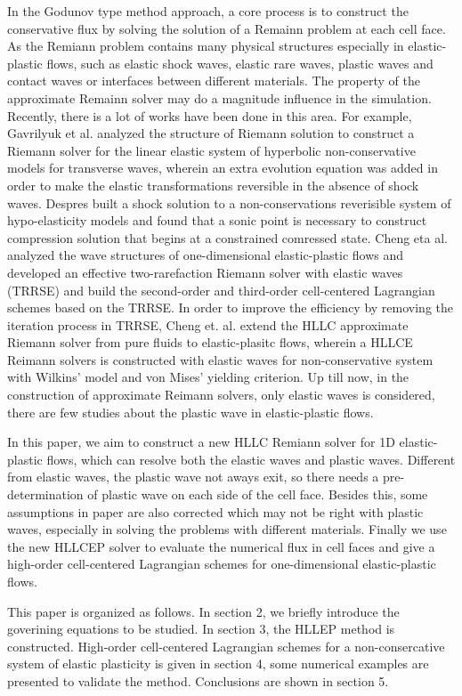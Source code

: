 \documentclass{article}
\numberwithin{equation}{section}
\numberwithin{table}{section}
\begin{document}
In the  Godunov type method  approach,  a core process is to construct the conservative flux by solving  the solution of a  Remainn problem  at each cell face. As the Remiann problem contains many physical structures especially in elastic-plastic flows, such as elastic shock waves, elastic rare waves, plastic waves and contact waves or interfaces between different materials. The property of the approximate Remainn solver may do a magnitude influence in the simulation. Recently, there is a lot of works have been done in this area. For example, Gavrilyuk et al. analyzed the structure of Riemann solution to construct a Riemann solver for the linear elastic system  of hyperbolic non-conservative models for transverse waves, wherein an extra evolution equation was added in order to make the elastic transformations reversible in the absence of shock waves. Despres built a shock solution to a non-conservations reverisible system of hypo-elasticity models and found that a sonic point is necessary to construct compression solution that begins at a constrained comressed state.  Cheng eta al. analyzed the wave structures of one-dimensional elastic-plastic flows and developed an effective two-rarefaction Riemann solver with elastic waves (TRRSE) and build the second-order and third-order cell-centered Lagrangian schemes based on the TRRSE. In order to improve the efficiency by removing the iteration process in TRRSE, Cheng et. al. extend the HLLC approximate Riemann solver from pure fluids to elastic-plasitc flows, wherein a HLLCE Reimann solvers is constructed with elastic waves for non-conservative system with Wilkins' model and von Mises' yielding criterion. 
Up till now, in the construction of approximate Reimann solvers, only elastic waves is considered, there are  few studies about the plastic wave in elastic-plastic flows.

In this paper,  we aim to construct a new HLLC Remiann solver for 1D elastic-plastic flows, which can resolve both the elastic waves and plastic waves. Different from elastic waves, the  plastic wave not aways exit, so there needs a pre-determination of plastic wave on each side of the cell face. Besides this, some assumptions in paper \cite{cheng} are also corrected which may not be right with plastic waves, especially in solving the problems with different materials. Finally we use  the new HLLCEP solver to evaluate the numerical flux in cell faces  and give a high-order cell-centered Lagrangian schemes for one-dimensional elastic-plastic flows. 

This paper is organized as follows. In section 2, we briefly introduce the goverining equations to be studied. In section 3, the HLLEP method is constructed.  High-order cell-centered Lagrangian schemes for a non-consercative system of elastic plasticity is given in section 4, some numerical examples are presented to validate the method.  Conclusions are shown in section 5.
\end{document}
